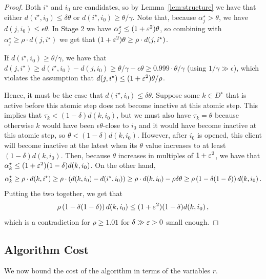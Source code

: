 \begin{proof}
    Both $i^\star$ and $i_0$ are candidates, so by Lemma~\ref{lem:structure} we have that either $d(i^\star,i_0) \leq \delta \theta$ or $d(i^\star,i_0) \geq \theta/\gamma$.
    Note that, because $\alpha_j^\star > \theta$, we have $d(j, i_0) \leq \epsilon \theta$.
    In Stage 2 we have $\alpha^\star_j \leq (1+\varepsilon^2) \theta$, so combining with $\alpha_j^\star \geq \rho \cdot d(j, i^\star)$ we get that $(1+\varepsilon^2) \theta \geq \rho \cdot d(j, i^\star)$.

    If $d(i^\star, i_0) \geq \theta/\gamma$, we have that $d(j, i^\star) \geq d(i^\star, i_0) - d(j, i_0) \geq \theta/\gamma - \epsilon\theta \geq 0.999 \cdot \theta/\gamma$ (using $1/\gamma \gg \epsilon$), which violates the assumption that $d(j, i^\star) \leq (1+\varepsilon^2) \theta/\rho$.

    Hence, it must be the case that $d(i^\star, i_0) \leq \delta \theta$.
    Suppose some $k \in D^\star$ that is active before this atomic step does not become inactive at this atomic step. 
    This implies that $\tau_k < (1-\delta) d(k, i_0)$, but we must also have $\tau_k = \theta$ because otherwise $k$ would have been $\epsilon \theta$-close to $i_0$ and it would have become inactive at this atomic step, so $\theta < (1-\delta) d(k, i_0)$.
    However, after $i_0$ is opened, this client will become inactive at the latest when its $\theta$ value increases to at least $(1-\delta) d(k, i_0)$.
    Then, because $\theta$ increases in multiples of $1+\varepsilon^2$, we have that $\alpha^\star_k \leq (1+\varepsilon^2)(1-\delta)d(k, i_0)$.
    On the other hand,
    \[\alpha^\star_k \geq \rho \cdot d(k, i^\star) \geq \rho \cdot (d(k, i_0) - d(i^\star, i_0)) \geq \rho \cdot d(k, i_0) - \rho \delta \theta \geq \rho \left(1 - \delta(1-\delta)\right) d(k, i_0)\,.\]
    Putting the two together, we get that
    \[\rho \left(1 - \delta(1-\delta)\right) d(k, i_0) \leq (1+\varepsilon^2)(1-\delta)d(k, i_0)\,,\]
    which is a contradiction for $\rho \geq 1.01$ for $\delta \gg \varepsilon > 0$ small enough.
\end{proof}

\subsection{Algorithm Cost}

We now bound the cost of the algorithm in terms of the variables $r$.

